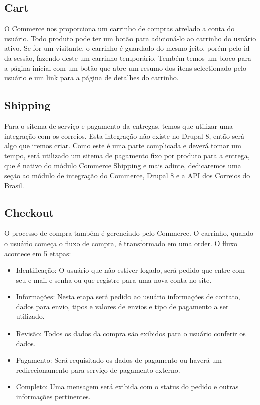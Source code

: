 \subsection{Cart}
O Commerce nos proporciona um carrinho de compras atrelado a conta do usuário. Todo produto pode ter um botão para adicioná-lo ao carrinho do usuário ativo. Se for um visitante, o carrinho é guardado do mesmo jeito, porém pelo id da sessão, fazendo deste um carrinho temporário. Tembém temos um bloco para a página inicial com um botão que abre um resumo dos itens selectionado pelo usuário e um link para a página de detalhes do carrinho.

\subsection{Shipping}
Para o sitema de serviço e pagamento da entregas, temos que utilizar uma integração com os correios. Esta integração não existe no Drupal 8, então será algo que iremos criar. Como este é uma parte complicada e deverá tomar um tempo, será utilizado um sitema de pagamento fixo por produto para a entrega, que é nativo do módulo Commerce Shipping e mais adinte, dedicaremos uma seção ao módulo de integração do Commerce, Drupal 8 e a API dos Correios do Brasil.

\subsection{Checkout}
O processo de compra também é gerenciado pelo Commerce. O carrinho, quando o usuário começa o fluxo de compra, é transformado em uma order. O fluxo acontece em 5 etapas:

\begin{itemize}
  \item Identificação: O usuário que não estiver logado, será pedido que entre com seu e-mail e senha ou que registre para uma nova conta no site.
  \item Informações: Nesta etapa será pedido ao usuário informações de contato, dados para envio, tipos e valores de envios e tipo de pagamento a ser utilizado.
  \item Revisão: Todos os dados da compra são exibidos para o usuário conferir os dados.
  \item Pagamento: Será requisitado os dados de pagamento ou haverá um redirecionamento para serviço de pagamento externo.
  \item Completo: Uma mensagem será exibida com o status do pedido e outras informações pertinentes.
\end{itemize}

